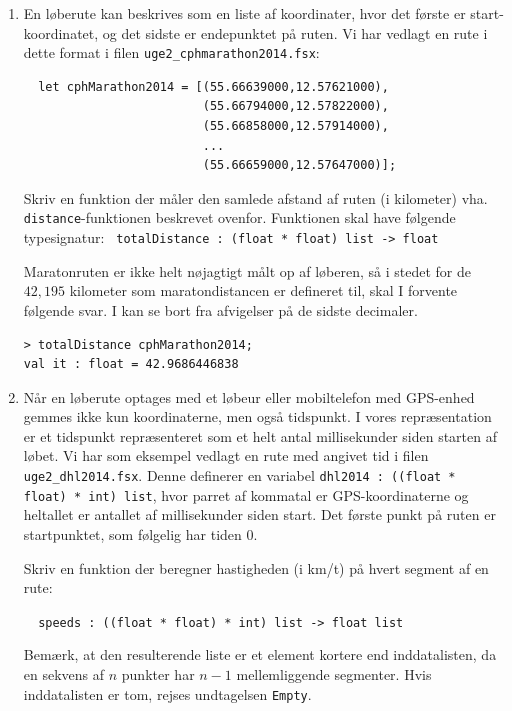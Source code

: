 \documentclass[a4paper,12pt]{article}
\begin{document}
\begin{enumerate}[{2}G1]
\item En løberute kan beskrives som en liste af koordinater, hvor det
  første er start-koordinatet, og det sidste er endepunktet på
  ruten.  Vi har vedlagt en rute i dette format i filen
  \texttt{uge2\_cphmarathon2014.fsx}:
  \begin{verbatim}
  let cphMarathon2014 = [(55.66639000,12.57621000),
                         (55.66794000,12.57822000),
                         (55.66858000,12.57914000),
                         ...
                         (55.66659000,12.57647000)];\end{verbatim}
  Skriv en funktion der måler den samlede afstand af ruten (i
  kilometer) vha. \verb|distance|-funktionen beskrevet
  ovenfor. Funktionen skal have følgende typesignatur:
  \verb| totalDistance : (float * float) list -> float|

  Maratonruten er ikke helt nøjagtigt målt op af løberen, så i stedet
  for de $42,195$ kilometer som maratondistancen er defineret til, skal I
  forvente følgende svar. I kan se bort fra afvigelser på de sidste
  decimaler.
\begin{verbatim}
> totalDistance cphMarathon2014;
val it : float = 42.9686446838
\end{verbatim}
\item Når en løberute optages med et løbeur eller mobiltelefon med
  GPS-enhed gemmes ikke kun koordinaterne, men også tidspunkt.  I
  vores repræsentation er et tidspunkt repræsenteret som et helt antal
  millisekunder siden starten af løbet.  Vi har som eksempel vedlagt
  en rute med angivet tid i filen \verb|uge2_dhl2014.fsx|.  Denne
  definerer en variabel \verb|dhl2014 : ((float * float) * int) list|,
  hvor parret af kommatal er GPS-koordinaterne og heltallet er
  antallet af millisekunder siden start.  Det første punkt på ruten er
  startpunktet, som følgelig har tiden 0.

  Skriv en funktion der beregner hastigheden (i km/t) på hvert segment
  af en rute:

  \verb|  speeds : ((float * float) * int) list -> float list|

  Bemærk, at den resulterende liste er et element kortere end
  inddatalisten, da en sekvens af $n$ punkter har $n-1$ mellemliggende
  segmenter.  Hvis inddatalisten er tom, rejses undtagelsen
  \verb|Empty|.


\end{enumerate}
\end{document}
